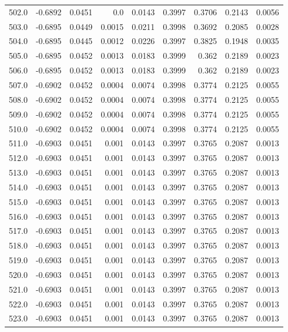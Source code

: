 \begin{longtable}{lrrrrrrrr}
502.0 & -0.6892 & 0.0451 & 0.0 & 0.0143 & 0.3997 & 0.3706 & 0.2143 & 0.0056 \\
503.0 & -0.6895 & 0.0449 & 0.0015 & 0.0211 & 0.3998 & 0.3692 & 0.2085 & 0.0028 \\
504.0 & -0.6895 & 0.0445 & 0.0012 & 0.0226 & 0.3997 & 0.3825 & 0.1948 & 0.0035 \\
505.0 & -0.6895 & 0.0452 & 0.0013 & 0.0183 & 0.3999 & 0.362 & 0.2189 & 0.0023 \\
506.0 & -0.6895 & 0.0452 & 0.0013 & 0.0183 & 0.3999 & 0.362 & 0.2189 & 0.0023 \\
507.0 & -0.6902 & 0.0452 & 0.0004 & 0.0074 & 0.3998 & 0.3774 & 0.2125 & 0.0055 \\
508.0 & -0.6902 & 0.0452 & 0.0004 & 0.0074 & 0.3998 & 0.3774 & 0.2125 & 0.0055 \\
509.0 & -0.6902 & 0.0452 & 0.0004 & 0.0074 & 0.3998 & 0.3774 & 0.2125 & 0.0055 \\
510.0 & -0.6902 & 0.0452 & 0.0004 & 0.0074 & 0.3998 & 0.3774 & 0.2125 & 0.0055 \\
511.0 & -0.6903 & 0.0451 & 0.001 & 0.0143 & 0.3997 & 0.3765 & 0.2087 & 0.0013 \\
512.0 & -0.6903 & 0.0451 & 0.001 & 0.0143 & 0.3997 & 0.3765 & 0.2087 & 0.0013 \\
513.0 & -0.6903 & 0.0451 & 0.001 & 0.0143 & 0.3997 & 0.3765 & 0.2087 & 0.0013 \\
514.0 & -0.6903 & 0.0451 & 0.001 & 0.0143 & 0.3997 & 0.3765 & 0.2087 & 0.0013 \\
515.0 & -0.6903 & 0.0451 & 0.001 & 0.0143 & 0.3997 & 0.3765 & 0.2087 & 0.0013 \\
516.0 & -0.6903 & 0.0451 & 0.001 & 0.0143 & 0.3997 & 0.3765 & 0.2087 & 0.0013 \\
517.0 & -0.6903 & 0.0451 & 0.001 & 0.0143 & 0.3997 & 0.3765 & 0.2087 & 0.0013 \\
518.0 & -0.6903 & 0.0451 & 0.001 & 0.0143 & 0.3997 & 0.3765 & 0.2087 & 0.0013 \\
519.0 & -0.6903 & 0.0451 & 0.001 & 0.0143 & 0.3997 & 0.3765 & 0.2087 & 0.0013 \\
520.0 & -0.6903 & 0.0451 & 0.001 & 0.0143 & 0.3997 & 0.3765 & 0.2087 & 0.0013 \\
521.0 & -0.6903 & 0.0451 & 0.001 & 0.0143 & 0.3997 & 0.3765 & 0.2087 & 0.0013 \\
522.0 & -0.6903 & 0.0451 & 0.001 & 0.0143 & 0.3997 & 0.3765 & 0.2087 & 0.0013 \\
523.0 & -0.6903 & 0.0451 & 0.001 & 0.0143 & 0.3997 & 0.3765 & 0.2087 & 0.0013 \\

\end{longtable}
